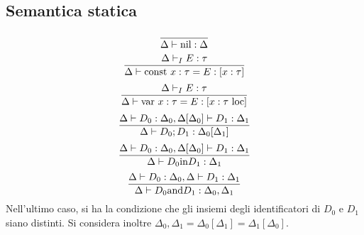\documentclass[a4paper]{report}
\newcommand{\nil}{\mathrm{nil}}
\newcommand{\const}{\mathrm{const}\ }
\newcommand{\var}{\mathrm{var}\ }
\newcommand{\loc}{\ \mathrm{loc}}
\theoremstyle{definition} \newtheorem*{defi}{Def}
\theoremstyle{plain} \newtheorem{lemma}{Lemma}
\theoremstyle{plain} \newtheorem{teo}{Teorema}
\theoremstyle{remark} \newtheorem*{es}{Esempio}
\DeclareRobustCommand{\frac}[3][0pt]{%
  {\begingroup\hspace{#1}#2\hspace{#1}\endgroup\over\hspace{#1}#3\hspace{#1}}}
\begin{document}
\subsection{Semantica statica}
\begin{equation}
  \frac{}{
    \Delta \vdash \nil : \Delta
  }
  \label{decl_stat_nil}
\end{equation}
\begin{equation}
  \frac{
    \Delta \vdash_I E:\tau
  }{
    \Delta \vdash \const x:\tau = E : [x:\tau]
  }
  \label{decl_stat_const}
\end{equation}
\begin{equation}
  \frac{
    \Delta \vdash_I E:\tau
  }{
    \Delta \vdash \var x:\tau = E : [x:\tau\loc]
  }
  \label{decl_stat_var}
\end{equation}
\begin{equation}
  \frac{
    \Delta \vdash D_0:\Delta_0, \Delta[\Delta_0] \vdash D_1:\Delta_1
  }{
    \Delta \vdash D_0;D_1 : \Delta_0[\Delta_1]
  }
  \label{decl_stat_seq}
\end{equation}
\begin{equation}
  \frac{
    \Delta \vdash D_0:\Delta_0, \Delta[\Delta_0] \vdash D_1:\Delta_1
  }{
    \Delta \vdash D_0 \mathrm{in} D_1 : \Delta_1
  }
  \label{decl_stat_in}
\end{equation}
\begin{equation}
  \frac{
    \Delta \vdash D_0:\Delta_0, \Delta \vdash D_1:\Delta_1
  }{
    \Delta \vdash D_0 \mathrm{and} D_1 : \Delta_0,\Delta_1
  }
  \label{decl_stat_and}
\end{equation}
Nell'ultimo caso, si ha la condizione che gli insiemi degli identificatori di
$D_0$ e $D_1$ siano distinti. Si considera inoltre $\Delta_0,\Delta_1=\Delta_0[\Delta_1]=\Delta_1[\Delta_0]$.
\end{document}
